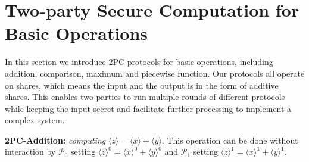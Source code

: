 \documentclass[letterpaper]{article} %
\begin{document}
\section{Two-party Secure Computation for Basic Operations}

    In this section we introduce 2PC protocols for basic operations,
    including addition, comparison, maximum and piecewise function.
    Our protocols all operate on shares, which means
    the input and the output is in the form of additive shares.
    This enables two parties to run multiple rounds of different
    protocols while keeping the input secret
    and facilitate further processing to implement a complex system.



    \textbf{2PC-Addition:}
    \emph{computing}
    $ \langle z\rangle  = \langle x\rangle  + \langle y\rangle $. This operation can be done without interaction by
    $\mathcal{P}_{0}$ setting $\langle z\rangle^{0}  = \langle x\rangle^{0}  + \langle y\rangle^{0} $ and
    $\mathcal{P}_{1}$ setting $\langle z\rangle^{1}  = \langle x\rangle^{1}  + \langle y\rangle^{1} $.



\end{document}
